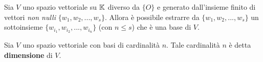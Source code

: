 \begin{theorem}
	Sia $V$ uno spazio vettoriale su $\mathbb{K}$ diverso da $\{O\}$ e generato dall'insieme finito di vettori
	\emph{non nulli} $\{w_1, w_2, ..., w_s\}$. Allora è possibile estrarre da $\{w_1, w_2, ..., w_s\}$ un
	sottoinsieme $\{w_{i_1}, w_{i_2}, ..., w_{i_n}\}$ (con $n \leq s$) che è una base di $V$.
\end{theorem}

\begin{definition}
	Sia $V$  uno spazio vettoriale con basi di cardinalità $n$. Tale cardinalità $n$ è detta \textbf{dimensione}
	di $V$.
\end{definition}
